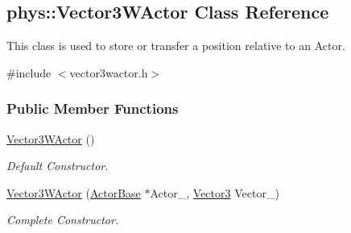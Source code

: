 \hypertarget{classphys_1_1Vector3WActor}{
\subsection{phys::Vector3WActor Class Reference}
\label{d2/de8/classphys_1_1Vector3WActor}
}


This class is used to store or transfer a position relative to an Actor.  




{\ttfamily \#include $<$vector3wactor.h$>$}

\subsubsection*{Public Member Functions}
\begin{DoxyCompactItemize}
\item 
\hyperlink{classphys_1_1Vector3WActor_a910f3ee25e7f654e7ba3bedb9942c8f7}{Vector3WActor} ()
\begin{DoxyCompactList}\small\item\em Default Constructor. \item\end{DoxyCompactList}\item 
\hyperlink{classphys_1_1Vector3WActor_ac87c4c55b9260f47f56fb01b6f061ded}{Vector3WActor} (\hyperlink{classphys_1_1ActorBase}{ActorBase} $\ast$Actor\_\-, \hyperlink{classphys_1_1Vector3}{Vector3} Vector\_\-)
\begin{DoxyCompactList}\small\item\em Complete Constructor. \item\end{DoxyCompactList}\end{DoxyCompactItemize}
